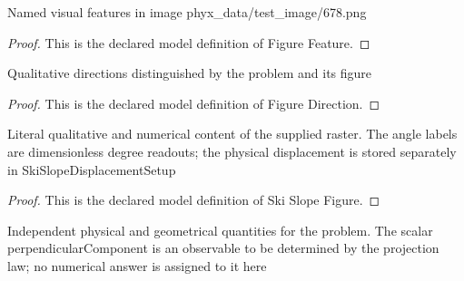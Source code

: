 \begin{definition}
  \label{def:physics:phyx-mini-0678:phyxminiproblems-problemphyxmini0678-figurefeature}
  Named visual features in image phyx\_data/test\_image/678.png
\end{definition}
\begin{proof}
  This is the declared model definition of Figure Feature.
\end{proof}
\begin{definition}
  \label{def:physics:phyx-mini-0678:phyxminiproblems-problemphyxmini0678-figuredirection}
  Qualitative directions distinguished by the problem and its figure
\end{definition}
\begin{proof}
  This is the declared model definition of Figure Direction.
\end{proof}
\begin{definition}
  \label{def:physics:phyx-mini-0678:phyxminiproblems-problemphyxmini0678-skislopefigure}
  Literal qualitative and numerical content of the supplied raster. The angle labels are dimensionless degree readouts; the physical displacement is stored separately in SkiSlopeDisplacementSetup
\end{definition}
\begin{proof}
  This is the declared model definition of Ski Slope Figure.
\end{proof}
\begin{definition}
  \label{def:physics:phyx-mini-0678:phyxminiproblems-problemphyxmini0678-skislopedisplacementsetup}
  Independent physical and geometrical quantities for the problem. The scalar perpendicularComponent is an observable to be determined by the projection law; no numerical answer is assigned to it here
\end{definition}
